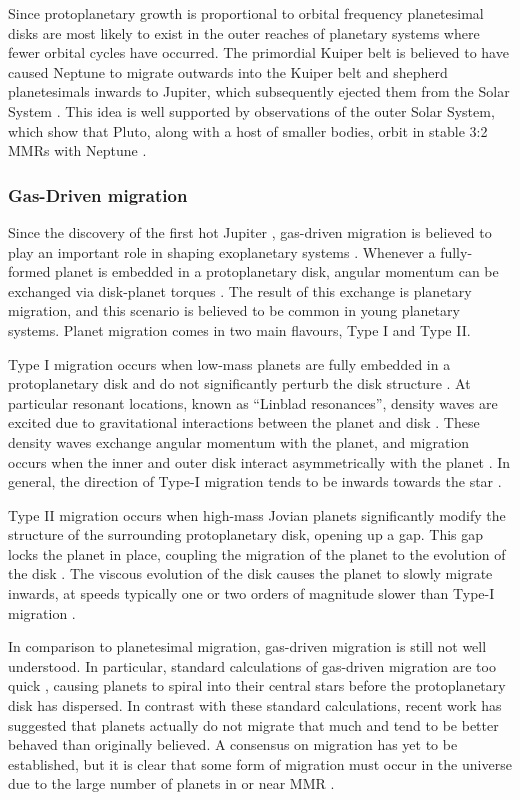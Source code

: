 \documentclass[12pt,letter]{aastex}
\begin{document}
Since protoplanetary growth is proportional to orbital frequency \citep{Rafikov2003} planetesimal disks are most likely to exist in the outer reaches of planetary systems where fewer orbital cycles have occurred. 
The primordial Kuiper belt is believed to have caused Neptune to migrate outwards into the Kuiper belt and shepherd planetesimals inwards to Jupiter, which subsequently ejected them from the Solar System \citep{Fernandez1984}.
This idea is well supported by observations of the outer Solar System, which show that Pluto, along with a host of smaller bodies, orbit in stable 3:2 MMRs with Neptune \citep{Malhotra1993, Malhotra1995}.

\subsubsection{Gas-Driven migration}
Since the discovery of the first hot Jupiter \citep{Mayor1995}, gas-driven migration is believed to play an important role in shaping exoplanetary systems \citep{Lin1996}.
Whenever a fully-formed planet is embedded in a protoplanetary disk, angular momentum can be exchanged via disk-planet torques \citep{Goldreich1980}.
The result of this exchange is planetary migration, and this scenario is believed to be common in young planetary systems. 
Planet migration comes in two main flavours, Type I and Type II. 

Type I migration occurs when low-mass planets are fully embedded in a protoplanetary disk and do not significantly perturb the disk structure \citep{Armitage2010}. 
At particular resonant locations, known as ``Linblad resonances'', density waves are excited due to gravitational interactions between the planet and disk \citep{Goldreich1979}. 
These density waves exchange angular momentum with the planet, and migration occurs when the inner and outer disk interact asymmetrically with the planet \citep{Goldreich1979}.
In general, the direction of Type-I migration tends to be inwards towards the star \citep{Ward1997}.

Type II migration occurs when high-mass Jovian planets significantly modify the structure of the surrounding protoplanetary disk, opening up a gap. 
This gap locks the planet in place, coupling the migration of the planet to the evolution of the disk \citep{Lin1986}.
The viscous evolution of the disk causes the planet to slowly migrate inwards, at speeds typically one or two orders of magnitude slower than Type-I migration \citep{Ward1997}.

In comparison to planetesimal migration, gas-driven migration is still not well understood. 
In particular, standard calculations of gas-driven migration are too quick \citep{Lin1986, Tanaka2002}, causing planets to spiral into their central stars before the protoplanetary disk has dispersed.
In contrast with these standard calculations, recent work \citep{Fung2017} has suggested that planets actually do not migrate that much and tend to be better behaved than originally believed. 
A consensus on migration has yet to be established, but it is clear that some form of migration must occur in the universe due to the large number of planets in or near MMR \citep{Lissauer2011,Fabrycky2014,Steffen2015}.
\end{document}
